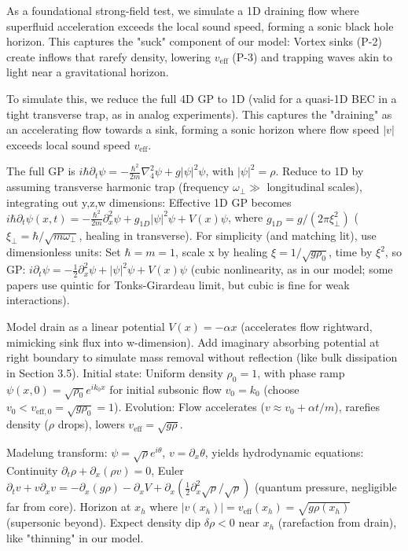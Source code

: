 \documentclass{article}
\begin{document}
As a foundational strong-field test, we simulate a 1D draining flow where superfluid acceleration exceeds the local sound speed, forming a sonic black hole horizon. This captures the "suck" component of our model: Vortex sinks (P-2) create inflows that rarefy density, lowering $v_{\text{eff}}$ (P-3) and trapping waves akin to light near a gravitational horizon.

To simulate this, we reduce the full 4D GP to 1D (valid for a quasi-1D BEC in a tight transverse trap, as in analog experiments). This captures the "draining" as an accelerating flow towards a sink, forming a sonic horizon where flow speed $|v|$ exceeds local sound speed $v_{\text{eff}}$.

The full GP is $i \hbar \partial_t \psi = -\frac{\hbar^2}{2m} \nabla_4^2 \psi + g |\psi|^2 \psi$, with $|\psi|^2 = \rho$. Reduce to 1D by assuming transverse harmonic trap (frequency $\omega_\perp \gg$ longitudinal scales), integrating out y,z,w dimensions: Effective 1D GP becomes $i \hbar \partial_t \psi(x,t) = -\frac{\hbar^2}{2m} \partial_x^2 \psi + g_{1D} |\psi|^2 \psi + V(x) \psi$, where $g_{1D} = g / (2\pi \xi_\perp^2)$ ($\xi_\perp = \hbar / \sqrt{m \omega_\perp}$, healing in transverse). For simplicity (and matching lit), use dimensionless units: Set $\hbar = m = 1$, scale x by healing $\xi = 1 / \sqrt{g \rho_0}$, time by $\xi^2$, so GP: $i \partial_t \psi = -\frac{1}{2} \partial_x^2 \psi + |\psi|^2 \psi + V(x) \psi$ (cubic nonlinearity, as in our model; some papers use quintic for Tonks-Girardeau limit, but cubic is fine for weak interactions).

Model drain as a linear potential $V(x) = -\alpha x$ (accelerates flow rightward, mimicking sink flux into w-dimension). Add imaginary absorbing potential at right boundary to simulate mass removal without reflection (like bulk dissipation in Section 3.5). Initial state: Uniform density $\rho_0 = 1$, with phase ramp $\psi(x,0) = \sqrt{\rho_0} e^{i k_0 x}$ for initial subsonic flow $v_0 = k_0$ (choose $v_0 < v_{\text{eff},0} = \sqrt{g \rho_0} = 1$). Evolution: Flow accelerates ($v \approx v_0 + \alpha t / m$), rarefies density ($\rho$ drops), lowers $v_{\text{eff}} = \sqrt{g \rho}$.

Madelung transform: $\psi = \sqrt{\rho} e^{i \theta}$, $v = \partial_x \theta$, yields hydrodynamic equations: Continuity $\partial_t \rho + \partial_x (\rho v) = 0$, Euler $\partial_t v + v \partial_x v = -\partial_x (g \rho) - \partial_x V + \partial_x (\frac{1}{2} \partial_x^2 \sqrt{\rho} / \sqrt{\rho})$ (quantum pressure, negligible far from core). Horizon at $x_h$ where $|v(x_h)| = v_{\text{eff}}(x_h) = \sqrt{g \rho(x_h)}$ (supersonic beyond). Expect density dip $\delta \rho < 0$ near $x_h$ (rarefaction from drain), like "thinning" in our model.
\end{document}
